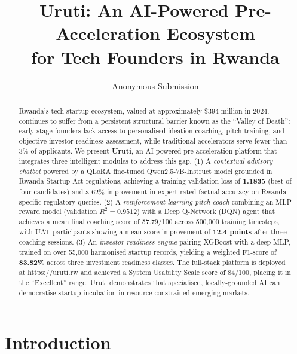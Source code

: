 \documentclass{article}
\title{Uruti: An AI-Powered Pre-Acceleration Ecosystem\\
       for Tech Founders in Rwanda}
\author{
    Anonymous Submission
}
\begin{document}
\maketitle


\begin{abstract}
Rwanda's tech startup ecosystem, valued at approximately \$394 million in 2024,
continues to suffer from a persistent structural barrier known as the
``Valley of Death'': early-stage founders lack access to personalised
ideation coaching, pitch training, and objective investor readiness assessment,
while traditional accelerators serve fewer than 3\% of applicants.
We present \textbf{Uruti}, an AI-powered pre-acceleration platform that
integrates three intelligent modules to address this gap.
(1) A \emph{contextual advisory chatbot} powered by a QLoRA fine-tuned
Qwen2.5-7B-Instruct model grounded in Rwanda Startup Act regulations, achieving
a training validation loss of \textbf{1.1835} (best of four candidates) and a
62\% improvement in expert-rated factual accuracy on Rwanda-specific regulatory queries.
(2) A \emph{reinforcement learning pitch coach} combining an MLP reward model
(validation $R^2 = 0.9512$) with a Deep Q-Network (DQN) agent that achieves a
mean final coaching score of 57.79/100 across 500{,}000 training timesteps,
with UAT participants showing a mean score improvement of \textbf{12.4 points}
after three coaching sessions.
(3) An \emph{investor readiness engine} pairing XGBoost with a deep MLP, trained on
over 55{,}000 harmonised startup records, yielding a weighted F1-score of
\textbf{83.82\%} across three investment readiness classes.
The full-stack platform is deployed at \url{https://uruti.rw} and achieved a
System Usability Scale score of 84/100, placing it in the ``Excellent'' range.
Uruti demonstrates that specialised, locally-grounded AI can democratise
startup incubation in resource-constrained emerging markets.
\end{abstract}


\FloatBarrier
\section{Introduction}
\end{document}
